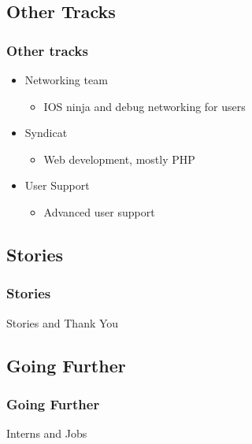 \documentclass{beamer}
\begin{document}
\subsection{Other Tracks}
\frame
{
    \frametitle{Other tracks}
    \begin{itemize}
      \item Networking team
    \begin{itemize}
      \item IOS ninja and debug networking for users
    \end{itemize}
      \item Syndicat
    \begin{itemize}
      \item Web development, mostly PHP
    \end{itemize}
      \item User Support
    \begin{itemize}
      \item Advanced user support
    \end{itemize}
    \end{itemize}
}

\subsection{Stories}
\frame
{
    \frametitle{Stories}
    Stories and Thank You
}

\subsection{Going Further}
\frame
{
    \frametitle{Going Further}
    Interns and Jobs
}
\end{document}
